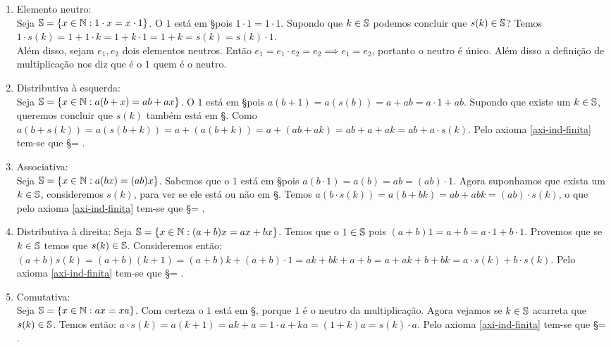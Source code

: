 \documentclass[../main.tex]{subfiles}
\begin{document}
\begin{dem}
    \begin{enumerate}[label=(\roman*)]
        \item Elemento neutro: \\
            Seja $\S = \{ x \in \N : 1 \cdot x = x \cdot 1 \}$. O $1$ está em \S pois $1 \cdot 1 = 1 \cdot 1$. Supondo que $k \in \S$ podemos concluir que $s(k) \in \S$?
            Temos $1 \cdot s(k) = 1 + 1 \cdot k = 1 + k \cdot 1 = 1 + k = s(k) = s(k) \cdot 1$. \\ Além disso, sejam $e_1, e_2$ dois elementos neutros. Então $e_1 = e_1 \cdot e_2 = e_2 \implies e_1 = e_2$, portanto o neutro é único. Além disso a definição de multiplicação nos diz que é o $1$ quem é o neutro. 
            
        \item Distributiva à esquerda: \\
            Seja $\S = \{ x \in \N : a(b+x) = ab+ax\}$. O $1$ está em \S pois $a(b+1) = a(s(b)) = a + ab = a \cdot 1 + ab$. Supondo que existe um $k \in \S$, queremos concluir que $s(k)$ também está em \S.
            Como $a(b+s(k)) = a(s(b+k)) = a + (a(b+k)) = a+(ab+ak) = ab + a + ak = ab+a \cdot s(k) $. Pelo axioma \ref{axi-ind-finita} tem-se que \S = \N.
        \item Associativa:  \\
            Seja $\S = \{ x \in \N : a(bx) = (ab)x \}$. Sabemos que o $1$ está em \S pois $a (b \cdot 1) = a(b) = ab = (ab)\cdot 1$.
            Agora suponhamos que exista um $k \in \S$, consideremos $s(k)$, para ver se ele está ou não em \S. Temos
            $a(b \cdot s(k)) = a(b + bk) = ab + abk = (ab) \cdot s(k)$, o que pelo axioma \ref{axi-ind-finita} tem-se que \S = \N. 
            
        \item Distributiva à direita: 
            Seja $\S = \{ x \in \N : (a+b)x = ax+bx\}$. Temos que o $1 \in \S$ pois $(a+b)1 = a+b = a \cdot 1+b \cdot 1$. Provemos que se $k \in \S$ temos que $s(k) \in \S$. Consideremos então: $(a+b)s(k)=(a+b)(k+1) = (a+b)k + (a+b) \cdot 1 = ak + bk + a + b = a+ak + b + bk = a\cdot s(k) + b \cdot s(k)$. Pelo axioma \ref{axi-ind-finita} tem-se que \S = \N.
            
        \item Comutativa: \\
            Seja $\S = \{ x \in \N : ax = xa \}$. Com certeza o $1$ está em \S, porque $1$ é o neutro da multiplicação. Agora vejamos se $k \in \S$ acarreta que $s(k) \in \S$. Temos então: $a \cdot s(k) = a (k+1) = ak + a = 1 \cdot a + ka = (1+k)a = s(k) \cdot a$. Pelo axioma \ref{axi-ind-finita} tem-se que \S = \N.
            

\end{enumerate}
\end{dem}
\end{document}
